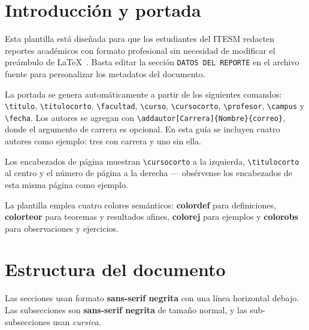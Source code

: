 \documentclass[letterpaper, 11pt]{article}
\makeatletter
\newcommand{\autores}{}
\newcommand{\addautor}[3][]{%
    \g@addto@macro\autores{%
        \begin{minipage}[t]{0.28\textwidth}\centering
            \textsc{#2}\\[2pt]
            \ifx\relax#1\relax\else{\footnotesize #1}\\[2pt]\fi
            {\small\textit{#3}}
        \end{minipage}\hspace{0.04\textwidth}\vspace{0.6cm}%
    }%
}
\newcommand{\titulo}{Guía Completa de la Plantilla de Reportes para Estudiantes del Tecnológico de Monterrey}
\newcommand{\titulocorto}{Guía Plantilla}         %
\newcommand{\facultad}{Escuela de Ingeniería y Ciencias}
\newcommand{\curso}{MA1234 --- Curso de Ejemplo}
\newcommand{\cursocorto}{MA1234}                   %
\newcommand{\profesor}{Dr.\ María García López}
\newcommand{\campus}{Campus Monterrey}
\newcommand{\fecha}{\today}
\makeatother
\begin{document}
\newpage

\tableofcontents
\newpage

\section{Introducción y portada}\label{sec:intro}

Esta plantilla está diseñada para que los estudiantes del ITESM
redacten reportes académicos con formato profesional sin necesidad de
modificar el preámbulo de \LaTeX{}~\cite{lamport1994}. Basta editar
la sección \texttt{DATOS DEL REPORTE} en el archivo fuente para
personalizar los metadatos del documento.

La portada se genera automáticamente a partir de los siguientes
comandos: \verb|\titulo|, \verb|\titulocorto|, \verb|\facultad|,
\verb|\curso|, \verb|\cursocorto|, \verb|\profesor|, \verb|\campus|
y \verb|\fecha|. Los autores se agregan con
\verb|\addautor[Carrera]{Nombre}{correo}|, donde el argumento de
carrera es opcional. En esta guía se incluyen cuatro autores como
ejemplo: tres con carrera y uno sin ella.

Los encabezados de página muestran \verb|\cursocorto| a la izquierda,
\verb|\titulocorto| al centro y el número de página a la derecha
--- obsérvense los encabezados de esta misma página como ejemplo.

La plantilla emplea cuatro colores semánticos: \textcolor{colordef}{%
\textbf{colordef}} para definiciones, \textcolor{colorteor}{%
\textbf{colorteor}} para teoremas y resultados afines,
\textcolor{colorej}{\textbf{colorej}} para ejemplos y
\textcolor{colorobs}{\textbf{colorobs}} para observaciones y
ejercicios.

\section{Estructura del documento}\label{sec:estructura}

Las secciones usan formato \textsf{\textbf{sans-serif negrita}} con
una línea horizontal debajo. Las subsecciones son
\textsf{\textbf{sans-serif negrita}} de tamaño normal, y las
sub-subsecciones usan \textit{cursiva}.
\end{document}
